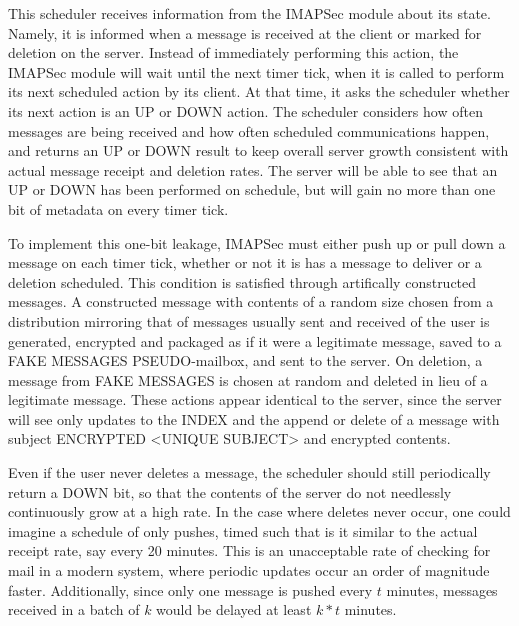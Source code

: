 \documentclass[pageno]{jpaper}
\newcommand{\project}{IMAPSec }
\begin{document}

This scheduler receives information from the \project module about its state. Namely, it is informed when a message is received at the client or marked for deletion on the server. Instead of immediately performing this action, the \project module will wait until the next timer tick, when it is called to perform its next scheduled action by its client. At that time, it asks the scheduler whether its next action is an UP or DOWN action. The scheduler considers how often messages are being received and how often scheduled communications happen, and returns an UP or DOWN result to keep overall server growth consistent with actual message receipt and deletion rates. The server will be able to see that an UP or DOWN has been performed on schedule, but will gain no more than one bit of metadata on every timer tick.

To implement this one-bit leakage, \project must either push up or pull down a message on each timer tick, whether or not it is has a message to deliver or a deletion scheduled. This condition is satisfied through artifically constructed messages. A constructed message with contents of a random size chosen from a distribution mirroring that of messages usually sent and received of the user is generated, encrypted and packaged as if it were a legitimate message, saved to a FAKE MESSAGES PSEUDO-mailbox, and sent to the server. On deletion, a message from FAKE MESSAGES is chosen at random and deleted in lieu of a legitimate message. These actions appear identical to the server, since the server will see only updates to the INDEX and the append or delete of a message with subject ENCRYPTED <UNIQUE SUBJECT> and encrypted contents.

Even if the user never deletes a message, the scheduler should still periodically return a DOWN bit, so that the contents of the server do not needlessly continuously grow at a high rate. In the case where deletes never occur, one could imagine a schedule of only pushes, timed such that is it similar to the actual receipt rate, say every 20 minutes. This is an unacceptable rate of checking for mail in a modern system, where periodic updates occur an order of magnitude faster. Additionally, since only one message is pushed every $t$ minutes, messages received in a batch of $k$ would be delayed at least $k*t$ minutes.
\end{document}
